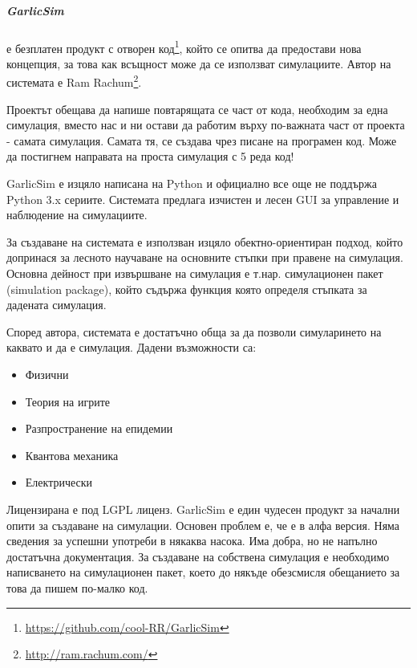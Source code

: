 		\subparagraph{GarlicSim} е безплатен продукт с отворен код\footnote{\url{https://github.com/cool-RR/GarlicSim}}, 
			който се опитва да предостави нова концепция, за това как всъщност може да се използват симулациите.
			Автор на системата е Ram Rachum\footnote{\url{http://ram.rachum.com/}}.														
			
			Проектът обещава да напише повтарящата се част от кода, необходим за една симулация, вместо нас и ни
			остави да работим върху по-важната част от проекта - самата симулация. Самата тя, се създава чрез 
			писане на програмен код. Може да постигнем направата на проста симулация с 5 реда код!   			
							
			GarlicSim е изцяло написана на Python и официално все още не поддържа Python 3.x сериите. 
			Системата предлага изчистен и лесен GUI за управление и наблюдение на симулациите. 			
		
			За създаване на системата е използван изцяло обектно-ориентиран подход, който допринася за лесното
			научаване на основните стъпки при правене на симулация. Основна дейност при извършване на симулация
			е т.нар. симулационен пакет (simulation package), който съдържа функция която определя стъпката за
			дадената симулация.
		
			Според автора, системата е достатъчно обща за да позволи симуларинето на каквато и да е симулация.
			Дадени възможности са:

				\begin{itemize}
				\item Физични
				\item Теория на игрите
				\item Разпространение на епидемии
				\item Квантова механика
				\item Електрически
			\end{itemize}								
			
			Лицензирана е под \ac{LGPL} лиценз. GarlicSim е един чудесен продукт за начални опити за създаване на симулации. 
			Основен проблем е, че е в алфа версия. Няма сведения за успешни употреби в някаква насока.
			Има добра, но не напълно достатъчна документация. За създаване на собствена симулация е необходимо
			написването на симулационен пакет, което до някъде обезсмисля обещанието за това да пишем по-малко код.
			\cite{GarlicSim}